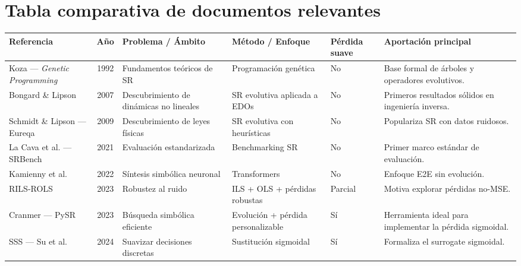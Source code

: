 \documentclass[12pt,a4paper]{article}
\begin{document}

\section*{Tabla comparativa de documentos relevantes}

\begin{table}[ht]
\centering \footnotesize \label{tab:comparativa_sr}
\begin{tabular}{|p{2.2cm}|c|p{3.5cm}|p{3.2cm}|p{1.3cm}|p{4.5cm}|}
\hline \textbf{Referencia} & \textbf{Año} & \textbf{Problema / Ámbito} & \textbf{Método / Enfoque} & \textbf{Pérdida suave} & \textbf{Aportación principal} \\ \hline

Koza — \textit{Genetic Programming} \cite{koza1992} & 1992 & Fundamentos teóricos de SR & Programación genética & No & Base formal de árboles y operadores evolutivos. \\ \hline

Bongard \& Lipson \cite{bongard2007} & 2007 & Descubrimiento de dinámicas no lineales & SR evolutiva aplicada a EDOs & No & Primeros resultados sólidos en ingeniería inversa. \\ \hline

Schmidt \& Lipson — Eureqa \cite{schmidt2009} & 2009 & Descubrimiento de leyes físicas & SR evolutiva con heurísticas & No & Populariza SR con datos ruidosos. \\ \hline

La Cava et al. — SRBench \cite{lacava2021} & 2021 & Evaluación estandarizada & Benchmarking SR & No & Primer marco estándar de evaluación. \\ \hline

Kamienny et al. \cite{kamienny2022} & 2022 & Síntesis simbólica neuronal & Transformers & No & Enfoque E2E sin evolución. \\ \hline

RILS-ROLS \cite{kartelj2023_rils} & 2023 & Robustez al ruido & ILS + OLS + pérdidas robustas & Parcial & Motiva explorar pérdidas no-MSE. \\ \hline

Cranmer — PySR \cite{cranmer2023_pysr} & 2023 & Búsqueda simbólica eficiente & Evolución + pérdida personalizable & Sí & Herramienta ideal para implementar la pérdida sigmoidal. \\ \hline

SSS — Su et al. \cite{su2024_sss} & 2024 & Suavizar decisiones discretas & Sustitución sigmoidal & Sí & Formaliza el surrogate sigmoidal. \\ \hline

\end{tabular}
\end{table}
\end{document}
